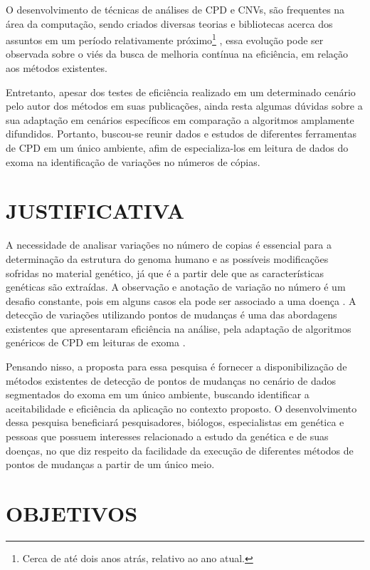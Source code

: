 O desenvolvimento de técnicas de análises de CPD e CNVs, são frequentes na área da computação, sendo criados diversas teorias e bibliotecas acerca dos assuntos em um período relativamente próximo\footnote{Cerca de até dois anos atrás, relativo ao ano atual.} \cite{Girimurugan2018,Uzai2019,Chu2019}, essa evolução pode ser observada sobre o viés da busca de melhoria contínua na eficiência, em relação aos métodos existentes.

Entretanto, apesar dos testes de eficiência realizado em um determinado cenário pelo autor dos métodos em suas publicações, ainda resta algumas dúvidas sobre a sua adaptação em cenários específicos em comparação a algoritmos amplamente difundidos. Portanto, buscou-se reunir dados e estudos de diferentes ferramentas de CPD em um único ambiente, afim de especializa-los em leitura de dados do exoma na identificação de variações no números de cópias.

\section{JUSTIFICATIVA}

A necessidade de analisar variações no número de copias é essencial para a determinação da estrutura do genoma humano e as possíveis modificações sofridas no material genético, já que é a partir dele que as características genéticas são extraídas. A observação e anotação de variação no número é um desafio constante, pois em alguns casos ela pode ser associado a uma doença \cite{McCarroll2007}. A detecção de variações utilizando pontos de mudanças é uma das abordagens existentes que apresentaram eficiência na análise, pela adaptação de algoritmos genéricos de CPD em leituras de exoma \cite{Olshen2004,Picard2011,Girimurugan2018}.

Pensando nisso, a proposta para essa pesquisa é fornecer a disponibilização de métodos existentes de detecção de pontos de mudanças no cenário de dados segmentados do exoma em um único ambiente, buscando identificar a aceitabilidade e eficiência da aplicação no contexto proposto. O desenvolvimento dessa pesquisa beneficiará pesquisadores, biólogos, especialistas em genética e pessoas que possuem interesses relacionado a estudo da genética e de suas doenças, no que diz respeito da facilidade da execução de diferentes métodos de pontos de mudanças a partir de um único meio.

\section{OBJETIVOS}

